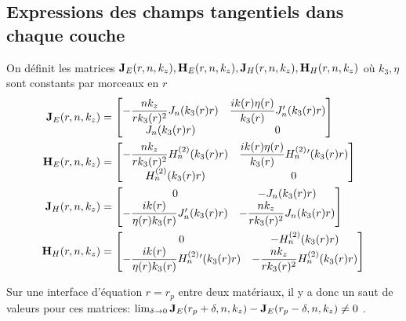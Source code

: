  \subsection{Expressions des champs tangentiels dans chaque couche}


    \begin{defn}
      \label{def:cylindre:JE-JH-HE-HH}
      On définit les matrices \(\mathbf{J}_{E}(r,n,k_z),\mathbf{H}_{E}(r,n,k_z),\mathbf{J}_{H}(r,n,k_z),\mathbf{H}_{H}(r,n,k_z)\) où \(k_3,\eta\) sont constants par morceaux en \(r\)
      \begin{align*}
        \mathbf{J}_{E}(r,n,k_z) &=
        \begin{bmatrix}
          -\dfrac{nk_z}{rk_3(r)^2}J_n(k_3(r)r) & \dfrac{ik(r)\eta(r)}{k_3(r)}J_n'(k_3(r)r)
          \\
          J_n(k_3(r)r) & 0
        \end{bmatrix}
        \\
        \mathbf{H}_{E}(r,n,k_z) &=
        \begin{bmatrix}
          -\dfrac{nk_z}{rk_3(r)^2}H_n^{(2)}(k_3(r)r) & \dfrac{ik(r)\eta(r)}{k_3(r)}H_n^{(2)}{}'(k_3(r)r)
          \\
          H_n^{(2)}(k_3(r)r) & 0
        \end{bmatrix}
        \\
        \mathbf{J}_{H}(r,n,k_z) &=
        \begin{bmatrix}
          0 & -J_n(k_3(r)r)
          \\
          -\dfrac{ik(r)}{\eta(r)k_3(r)}J_n'(k_3(r)r) & -\dfrac{nk_z}{rk_3(r)^2}J_n(k_3(r)r)
        \end{bmatrix}
        \\
        \mathbf{H}_{H}(r,n,k_z) &=
        \begin{bmatrix}
          0 & -H_n^{(2)}(k_3(r)r)
          \\
          -\dfrac{ik(r)}{\eta(r)k_3(r)}H_n^{(2)}{}'(k_3(r)r) & -\dfrac{nk_z}{rk_3(r)^2}H_n^{(2)}(k_3(r)r)
        \end{bmatrix}
      \end{align*}
    \end{defn}

    Sur une interface d'équation \(r=r_p\) entre deux matériaux, il y a donc un saut de valeurs pour ces matrices: \(\lim_{\delta\rightarrow 0 } \mathbf{J}_E(r_p+ \delta,n,k_z) - \mathbf{J}_E(r_p - \delta,n,k_z) \not = 0\) .

